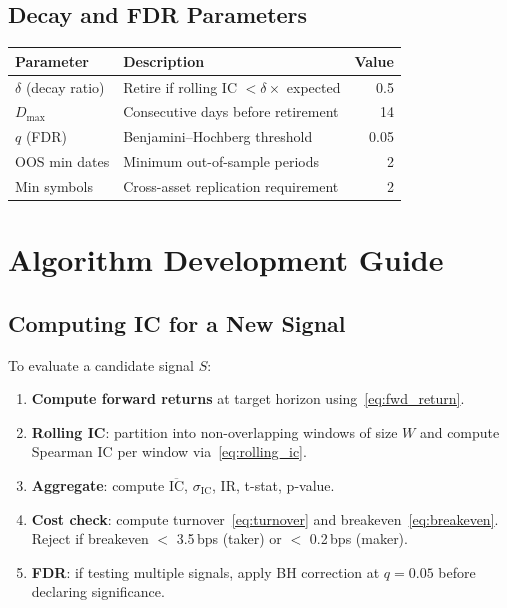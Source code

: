 \documentclass[11pt,a4paper]{article}
\newcommand{\toprule}{\hline\hline}
\newcommand{\midrule}{\hline}
\newcommand{\bottomrule}{\hline\hline}
\begin{document}
\subsection{Decay and FDR Parameters}

\begin{center}
\begin{tabular}{llr}
    \toprule
    \textbf{Parameter} & \textbf{Description} & \textbf{Value} \\
    \midrule
    $\delta$ (decay ratio) & Retire if rolling IC $< \delta \times$ expected & 0.5 \\
    $D_{\max}$ & Consecutive days before retirement & 14 \\
    $q$ (FDR) & Benjamini--Hochberg threshold & 0.05 \\
    OOS min dates & Minimum out-of-sample periods & 2 \\
    Min symbols & Cross-asset replication requirement & 2 \\
    \bottomrule
\end{tabular}
\end{center}

\section{Algorithm Development Guide}

\subsection{Computing IC for a New Signal}

To evaluate a candidate signal $S$:

\begin{enumerate}
    \item \textbf{Compute forward returns} at target horizon using~\eqref{eq:fwd_return}.
    \item \textbf{Rolling IC}: partition into non-overlapping windows of
        size $W$ and compute Spearman IC per window via~\eqref{eq:rolling_ic}.
    \item \textbf{Aggregate}: compute $\overline{\mathrm{IC}}$,
        $\sigma_{\mathrm{IC}}$, IR, t-stat, p-value.
    \item \textbf{Cost check}: compute turnover~\eqref{eq:turnover} and
        breakeven~\eqref{eq:breakeven}. Reject if breakeven $<$ 3.5\,bps
        (taker) or $<$ 0.2\,bps (maker).
    \item \textbf{FDR}: if testing multiple signals, apply BH correction
        at $q = 0.05$ before declaring significance.
\end{enumerate}
\end{document}
